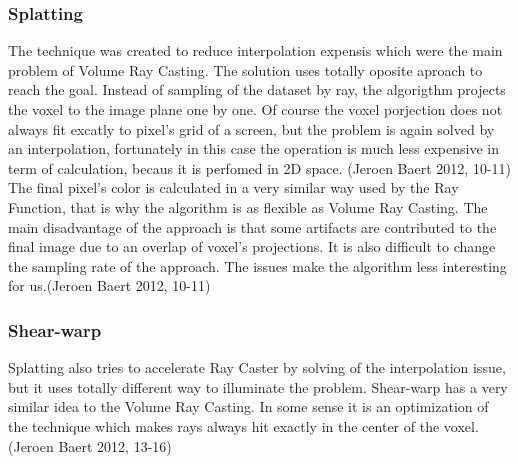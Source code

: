 \documentclass[twoside, english, 11pt]{report}
\begin{document}
\subsubsection{Splatting}

The technique was created to reduce interpolation expensis which were the main problem of Volume Ray Casting. The solution uses totally oposite aproach to reach the goal. Instead of sampling of the dataset by ray, the algorigthm projects the voxel to the image plane one by one. Of course the voxel porjection does not always fit excatly to pixel's grid of a screen, but the problem is again solved by an interpolation, fortunately in this case the operation is much less expensive in term of calculation, becaus it is perfomed in 2D space. (Jeroen Baert 2012, 10-11)\\

The final pixel's color is calculated in a very similar way used by the Ray Function, that is why the algorithm is as flexible as Volume Ray Casting. The main disadvantage of the approach is that some artifacts are contributed to the final image due to an overlap of voxel's projections. It is also difficult to change the sampling rate of the approach. The issues make the algorithm less interesting for us.(Jeroen Baert 2012, 10-11)\\

\subsubsection{Shear-warp}

Splatting also tries to accelerate Ray Caster by solving of the interpolation issue, but it uses totally different way to illuminate the problem. Shear-warp has a very similar idea to the Volume Ray Casting. In some sense it is an optimization of the technique which makes rays always hit exactly in the center of the voxel.(Jeroen Baert 2012, 13-16)\\
\end{document}
